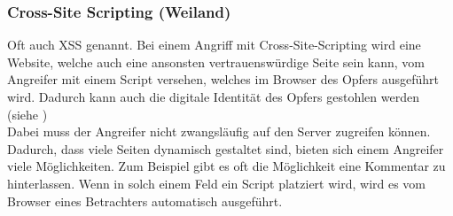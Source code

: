 \subsubsection{Cross-Site Scripting (Weiland)}
Oft auch XSS genannt. Bei einem Angriff mit Cross-Site-Scripting wird eine Website, welche auch eine ansonsten vertrauenswürdige Seite sein kann, vom Angreifer mit einem Script versehen, welches im Browser des Opfers ausgeführt wird. Dadurch kann auch die digitale Identität des Opfers gestohlen werden (siehe  )\\ %
Dabei muss der Angreifer nicht zwangsläufig auf den Server zugreifen können. Dadurch, dass viele Seiten dynamisch gestaltet sind, bieten sich einem Angreifer viele Möglichkeiten. Zum Beispiel gibt es oft die Möglichkeit eine Kommentar zu hinterlassen. Wenn in solch einem Feld ein Script platziert wird, wird es vom Browser eines Betrachters automatisch ausgeführt.
